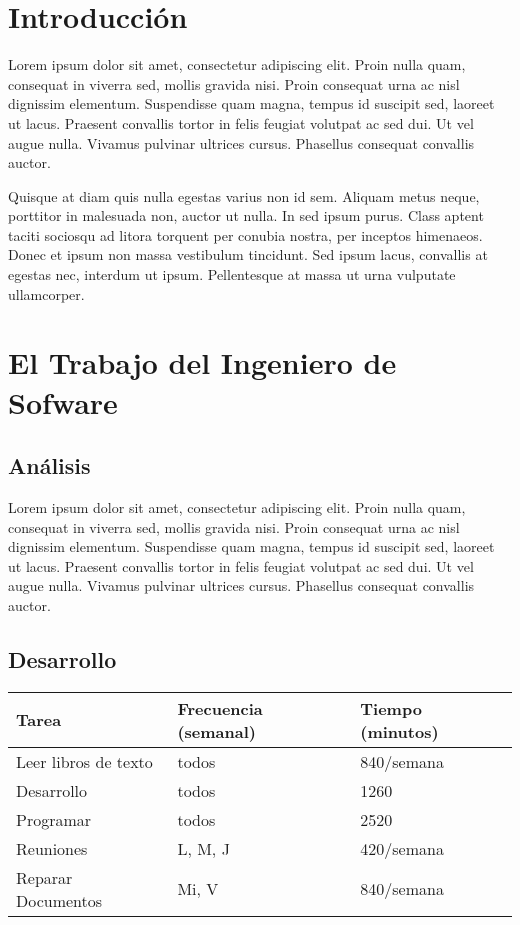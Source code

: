 \documentclass[a4paper,12pt,openany,oneside]{book}
\begin{document}
\chapter*{Introducción}
\thispagestyle{empty}
Lorem ipsum dolor sit amet, consectetur adipiscing elit. Proin nulla quam, consequat in viverra sed, mollis gravida nisi. Proin consequat urna ac nisl dignissim elementum. Suspendisse quam magna, tempus id suscipit sed, laoreet ut lacus. Praesent convallis tortor in felis feugiat volutpat ac sed dui. Ut vel augue nulla. Vivamus pulvinar ultrices cursus. Phasellus consequat convallis auctor.

Quisque at diam quis nulla egestas varius non id sem. Aliquam metus neque, porttitor in malesuada non, auctor ut nulla. In sed ipsum purus. Class aptent taciti sociosqu ad litora torquent per conubia nostra, per inceptos himenaeos. Donec et ipsum non massa vestibulum tincidunt. Sed ipsum lacus, convallis at egestas nec, interdum ut ipsum. Pellentesque at massa ut urna vulputate ullamcorper.
\chapter{El Trabajo del Ingeniero de Sofware}
\thispagestyle{empty}
\section{Análisis}
Lorem ipsum dolor sit amet, consectetur adipiscing elit. Proin nulla quam, consequat in viverra sed, mollis gravida nisi. Proin consequat urna ac nisl dignissim elementum. Suspendisse quam magna, tempus id suscipit sed, laoreet ut lacus. Praesent convallis tortor in felis feugiat volutpat ac sed dui. Ut vel augue nulla. Vivamus pulvinar ultrices cursus. Phasellus consequat convallis auctor.
\section{Desarrollo}
\begin{tabular}{|l | l | l |}
\hline
\textbf{Tarea} & \textbf{Frecuencia (semanal)} & \textbf{Tiempo (minutos)} \\
\hline
Leer libros de texto & todos & 840/semana\\
\hline
Desarrollo & todos & 1260\\
\hline
Programar & todos & 2520\\
\hline
Reuniones & L, M, J & 420/semana\\
\hline
Reparar Documentos & Mi, V & 840/semana\\
\hline
\end{tabular}
\end{document}
